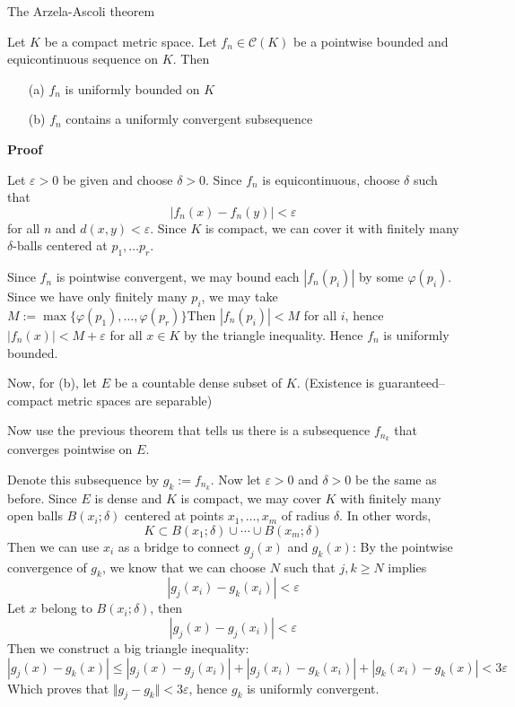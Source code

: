 \begin{theorem} The Arzela-Ascoli theorem

    Let $K$ be a compact metric space. Let $f_n \in \mathscr{C}(K)$ be a pointwise bounded and equicontinuous sequence on $K$. Then
    \begin{itemize}
        \item[(a)] $f_n$ is uniformly bounded on $K$
        \item[(b)] $f_n$ contains a uniformly convergent subsequence
    \end{itemize}

    \textbf{Proof}

    Let $\varepsilon >0$ be given and choose $\delta > 0$. Since $f_n$ is equicontinuous, choose $\delta$ such that
    \[|f_n(x) - f_n(y)| < \varepsilon\]
    for all $n$ and $d(x, y) < \varepsilon$. Since $K$ is compact, we can cover it with finitely many $\delta$-balls centered at $p_1, \ldots p_r$. 

    Since $f_n$ is pointwise convergent, we may bound each $|f_n(p_i)|$ by some $\varphi(p_i)$. Since we have only finitely many $p_i$, we may take $M := \max \{\varphi(p_1), \ldots, \varphi(p_r)\}$Then $|f_n(p_i)| < M$ for all $i$, hence $|f_n(x)| < M + \varepsilon$ for all $x \in K$ by the triangle inequality. Hence $f_n$ is uniformly bounded.

    Now, for (b), let $E$ be a countable dense subset of $K$. (Existence is guaranteed-- compact metric spaces are separable)

    Now use the previous theorem that tells us there is a subsequence $f_{n_k}$ that converges pointwise on $E$.

    Denote this subsequence by $g_k := f_{n_k}$. Now let $\varepsilon > 0$ and $\delta > 0$ be the same as before. Since $E$ is dense and $K$ is compact, we may cover $K$ with finitely many open balls $B(x_i; \delta)$ centered at points $x_1, \ldots, x_m$ of radius $\delta$. In other words,
    \[K \subset B(x_1; \delta) \cup \cdots \cup B(x_m; \delta)\]
    Then we can use $x_i$ as a bridge to connect $g_j(x)$ and $g_k(x)$: By the pointwise convergence of $g_k$, we know that we can choose $N$ such that $j, k \geq N$ implies 
    \[|g_j(x_i) - g_k(x_i)| < \varepsilon\]
    Let $x$ belong to $B(x_i; \delta)$, then
    \[|g_j(x) - g_j(x_i)| < \varepsilon\]
    Then we construct a big triangle inequality:
    \[|g_j(x) - g_k(x)| \leq |g_j(x) - g_j(x_i)| + |g_j(x_i) - g_k(x_i)| + |g_k(x_i) - g_k(x)| < 3\varepsilon\]
    Which proves that $\Vert g_j - g_k \Vert < 3\varepsilon$, hence $g_k$ is uniformly convergent.
\end{theorem}

